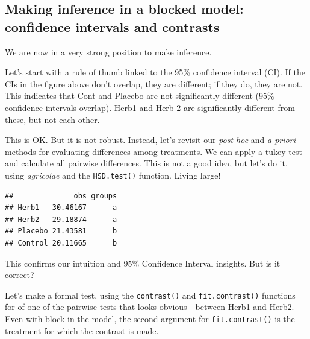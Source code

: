 \documentclass[
]{book}
\newenvironment{Shaded}{\begin{snugshade}}{\end{snugshade}}
\newcommand{\AttributeTok}[1]{\textcolor[rgb]{0.77,0.63,0.00}{#1}}
\newcommand{\CommentTok}[1]{\textcolor[rgb]{0.56,0.35,0.01}{\textit{#1}}}
\newcommand{\ConstantTok}[1]{\textcolor[rgb]{0.00,0.00,0.00}{#1}}
\newcommand{\FunctionTok}[1]{\textcolor[rgb]{0.00,0.00,0.00}{#1}}
\newcommand{\NormalTok}[1]{#1}
\newcommand{\OtherTok}[1]{\textcolor[rgb]{0.56,0.35,0.01}{#1}}
\newcommand{\SpecialCharTok}[1]{\textcolor[rgb]{0.00,0.00,0.00}{#1}}
\newcommand{\StringTok}[1]{\textcolor[rgb]{0.31,0.60,0.02}{#1}}
\begin{document}
\hypertarget{making-inference-in-a-blocked-model-confidence-intervals-and-contrasts}{%
\subsection{Making inference in a blocked model: confidence intervals and contrasts}\label{making-inference-in-a-blocked-model-confidence-intervals-and-contrasts}}

We are now in a very strong position to make inference.

Let's start with a rule of thumb linked to the 95\% confidence interval (CI). If the CIs in the figure above don't overlap, they are different; if they do, they are not. This indicates that Cont and Placebo are not significantly different (95\% confidence intervals overlap). Herb1 and Herb 2 are significantly different from these, but not each other.

This is OK. But it is not robust. Instead, let's revisit our \emph{post-hoc} and \emph{a priori} methods for evaluating differences among treatments. We can apply a tukey test and calculate all pairwise differences. This is not a good idea, but let's do it, using \emph{agricolae} and the \texttt{HSD.test()} function. Living large!

\begin{Shaded}
\end{Shaded}

\begin{verbatim}
##              obs groups
## Herb1   30.46167      a
## Herb2   29.18874      a
## Placebo 21.43581      b
## Control 20.11665      b
\end{verbatim}

This confirms our intuition and 95\% Confidence Interval insights. But is it correct?

Let's make a formal test, using the \texttt{contrast()} and \texttt{fit.contrast()} functions for of one of the pairwise tests that looks obvious - between Herb1 and Herb2. Even with block in the model, the second argument for \texttt{fit.contrast()} is the treatment for which the contrast is made.
\end{document}
